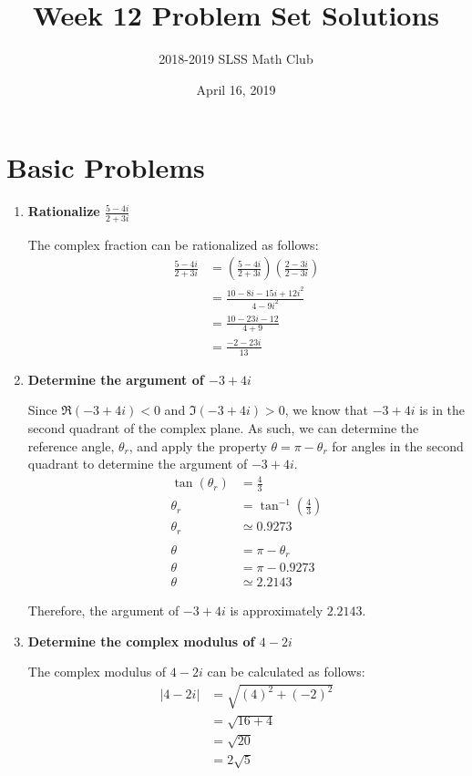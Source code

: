 \documentclass[12pt]{article}
\title{Week 12 Problem Set Solutions\vspace{-3mm}}
\author{2018-2019 SLSS Math Club\vspace{-5mm}}
\date{April 16, 2019\vspace{-5mm}}
\begin{document}
\maketitle

\section*{Basic Problems}
\begin{enumerate}
    \item \textbf{Rationalize $\displaystyle{\frac{5 - 4i}{2 + 3i}}$}
    
    The complex fraction can be rationalized as follows:
    \begin{align*}
        \frac{5 - 4i}{2 + 3i} &= (\frac{5 - 4i}{2 + 3i})(\frac{2 - 3i}{2 - 3i}) \\
        &= \frac{10 - 8i - 15i + 12i^2}{4 - 9i^2} \\
        &= \frac{10 - 23i - 12}{4 + 9} \\
        &= \frac{-2 - 23i}{13}
    \end{align*}
    
    \item \textbf{Determine the argument of $-3 + 4i$}
    
    Since $\Re{(-3 + 4i)} < 0$ and $\Im{(-3 + 4i)} > 0$, we know that $-3 + 4i$ is in the second quadrant of the complex plane. As such, we can determine the reference angle, $\theta_{r}$, and apply the property $\theta = \pi - \theta_{r}$ for angles in the second quadrant to determine the argument of $-3 + 4i$.
    \begin{align*}
        \tan{(\theta_{r})} &= \frac{4}{3} \\
        \theta_{r} &= \tan^{-1}(\frac{4}{3}) \\ 
        \theta_r &\simeq 0.9273 \\ \\
        \theta &= \pi - \theta_r \\
        \theta &= \pi - 0.9273 \\
        \theta &\simeq 2.2143
    \end{align*}
    
    Therefore, the argument of $-3 + 4i$ is approximately $2.2143$.
    
    \item \textbf{Determine the complex modulus of $4 - 2i$}
    
    The complex modulus of $4 - 2i$ can be calculated as follows:
    \begin{align*}
        |4 - 2i| &= \sqrt{(4)^2 + (-2)^2} \\
                &= \sqrt{16 + 4} \\
                &= \sqrt{20} \\
                &= 2\sqrt{5}
    \end{align*}
\end{enumerate}
\end{document}
